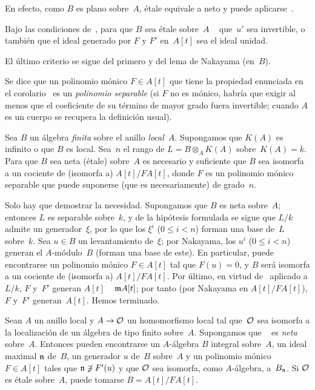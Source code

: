 En efecto, como $B$ es plano sobre~$A$, étale equivale a neto y puede aplicarse~.

\begin{corollaire}
\label{I.7.4}
Bajo las condiciones de~, para que $B$ sea étale sobre~$A$ \ %
que~$u'$ sea invertible, o también que el ideal generado por $F$ y $F'$ en~$A[t]$ sea el ideal unidad.
\end{corollaire}

El último criterio se sigue del primero y del lema de Nakayama (en~$B$).

Se dice que un polinomio mónico $F\in A[t]$ que tiene la propiedad
enunciada en el corolario~
es un \emph{polinomio separable}
%
(si $F$ no es mónico, habría que exigir al menos que el coeficiente de su término de mayor grado fuera invertible; cuando $A$ es un cuerpo se recupera la definición usual).

\begin{corollaire}
\label{I.7.5}
Sea $B$ un álgebra \emph{finita} sobre el anillo \emph{local}~$A$. Supongamos que $K(A)$ es infinito o que $B$ es local. Sea~$n$ el rango de $L=B\otimes_AK(A)$ sobre~$K(A)=k$. Para que $B$ sea neta (\resp étale) sobre~$A$ es necesario y suficiente que $B$ sea isomorfa a un cociente de (\resp isomorfa a) $A[t]/FA[t]$, donde $F$ es un polinomio mónico separable que puede suponerse (\resp que es necesariamente) de grado~$n$.
\end{corollaire}

Solo hay que demostrar la necesidad. Supongamos que $B$ es neta sobre~$A$; entonces $L$ es separable sobre~$k$, y de la hipótesis formulada se sigue que $L/k$ admite un generador~$\xi$, por lo que los $\xi^i$ ($0\leq i<n$) forman una base de~$L$ sobre~$k$. Sea $u\in B$ un levantamiento de~$\xi$; por Nakayama, los $u^i$ ($0\leq i<n$) generan el $A$-módulo~$B$ (\resp forman una base de este). En particular, puede encontrarse un polinomio mónico $F\in A[t]$ tal que $F(u)=0$, y $B$ será isomorfa a un cociente de (\resp isomorfa a) $A[t]/FA[t]$. Por último, en virtud de~ aplicado a $L/k$, $F$ y~$F'$ generan $A[t]$ \ %
$\goth{m}A[t]$; por tanto (por Nakayama en $A[t]/FA[t]$), $F$ y~$F'$ generan~$A[t]$. Hemos terminado.

\begin{theoreme}
\label{I.7.6}
Sean $A$ un anillo local y $A\to\cal{O}$ un homomorfismo local tal que~$\cal{O}$ sea isomorfa a la localización de un álgebra de tipo finito sobre~$A$. Supongamos que \ %
es \emph{neta} sobre~$A$. Entonces pueden encontrarse un $A$-álgebra $B$ integral sobre~$A$, un ideal maximal $\goth{n}$ de~$B$, un generador $u$ de~$B$ sobre~$A$ y un polinomio mónico $F\in A[t]$ tales que $\goth{n}\not\ni F'(u)$ y que $\cal{O}$ sea isomorfa, como $A$-álgebra, a~$B_{\goth{n}}$. Si $\cal{O}$ es étale sobre~$A$, puede tomarse $B=A[t]/FA[t]$.
\end{theoreme}

